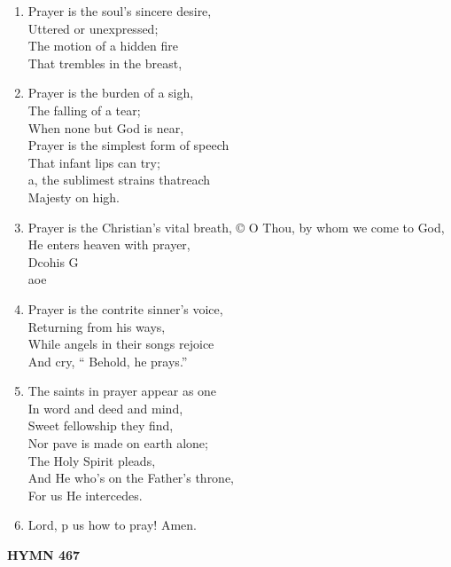 \documentclass[11pt,a4paper]{article}
\begin{document}
\begin{enumerate}
    \item Prayer is the soul's sincere desire, \\
        Uttered or unexpressed; \\
        The motion of a hidden fire \\
        That trembles in the breast,

    \item Prayer is the burden of a sigh, \\
        The falling of a tear; \\
        When none but God is near, \\
        Prayer is the simplest form of speech \\
        That infant lips can try; \\
        a, the sublimest strains thatreach \\
        Majesty on high.

    \item Prayer is the Christian's vital breath, © O Thou, by whom we come to God, \\
        He enters heaven with prayer, \\
        Dcohis G \\
        aoe

    \item Prayer is the contrite sinner's voice, \\
        Returning from his ways, \\
        While angels in their songs rejoice \\
        And cry, `` Behold, he prays.''

    \item The saints in prayer appear as one \\
        In word and deed and mind, \\
        Sweet fellowship they find, \\
        Nor pave is made on earth alone; \\
        The Holy Spirit pleads, \\
        And He who's on the Father's throne, \\
        For us He intercedes.

    \item Lord, p us how to pray! Amen.

\end{enumerate}

\newpage
\begin{center}
    {\Large \textbf{HYMN 467}}
\end{center}
\vspace{1em}
\end{document}
